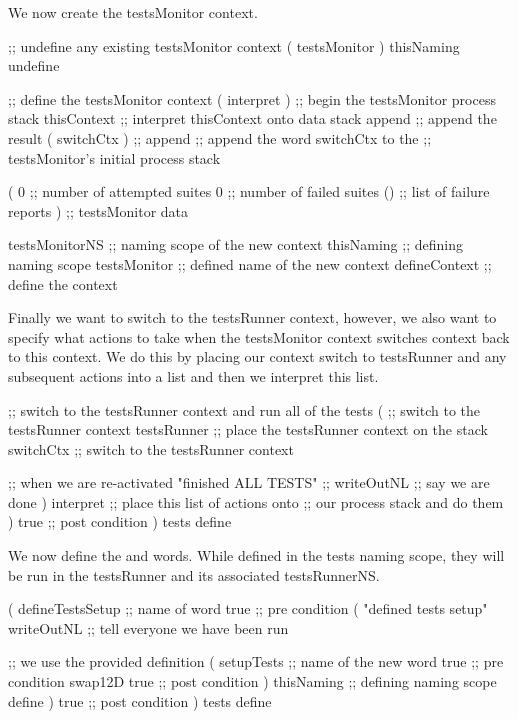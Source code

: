 We now create the testsMonitor context.

\startJoylolCode
    ;; undefine any existing testsMonitor context
    ( testsMonitor )
    thisNaming
    undefine

    ;; define the testsMonitor context
    ( interpret )   ;; begin the testsMonitor process stack
    thisContext     ;; interpret thisContext onto data stack
    append          ;; append the result
    ( switchCtx )   ;;
    append          ;; append the word switchCtx to the
                    ;; testsMonitor's initial process stack
  
    (
      0             ;; number of attempted suites
      0             ;; number of failed suites
      ()            ;; list of failure reports
    )               ;; testsMonitor data
  
    testsMonitorNS  ;; naming scope of the new context
    thisNaming      ;; defining naming scope
    testsMonitor    ;; defined name of the new context
    defineContext   ;; define the context
\stopJoylolCode

Finally we want to switch to the testsRunner context, however, we also 
want to specify what actions to take when the testsMonitor context 
switches context back to this context. We do this by placing our context 
switch to testsRunner and any subsequent actions into a list and then we 
interpret this list. 

\startJoylolCode
    ;; switch to the testsRunner context and run all of the tests
    (
      ;; switch to the testsRunner context
      testsRunner ;; place the testsRunner context on the stack
      switchCtx   ;; switch to the testsRunner context
    
      ;; when we are re-activated
      "finished ALL TESTS"  ;;
      writeOutNL            ;; say we are done
    )
    interpret     ;; place this list of actions onto
                  ;; our process stack and do them
  )
  { true }        ;; post condition
)
tests
define
\stopJoylolCode

We now define the  and  
words. While defined in the tests naming scope, they will be run in the 
testsRunner and its associated testsRunnerNS. 

\startJoylolCode
( 
  defineTestsSetup ;; name of word
  { true }         ;; pre condition
  (
    "defined tests setup"
    writeOutNL     ;; tell everyone we have been run
  
                   ;; we use the provided definition
    (
      setupTests   ;; name of the new word
      { true }     ;; pre condition
      swap12D
      { true }     ;; post condition
    )
    thisNaming     ;; defining naming scope
    define
  )
  { true }         ;; post condition
)
tests
define
\stopJoylolCode

